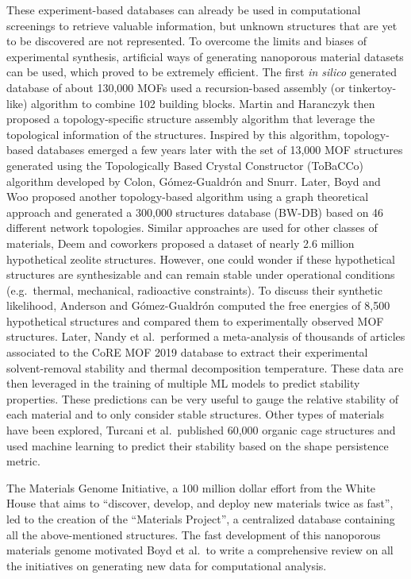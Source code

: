 \documentclass[main.tex]{subfiles}
\begin{document}
These experiment-based databases can already be used in computational screenings to retrieve valuable information, but unknown structures that are yet to be discovered are not represented. To overcome the limits and biases of experimental synthesis, artificial ways of generating nanoporous material datasets can be used, which proved to be extremely efficient. The first \emph{in silico} generated database of about 130,000 MOFs used a recursion-based assembly (or tinkertoy-like) algorithm to combine 102 building blocks.\cite{Wilmer_2012} Martin and Haranczyk then proposed a topology-specific structure assembly algorithm that leverage the topological information of the structures.\cite{Martin_2014} Inspired by this algorithm, topology-based databases emerged a few years later with the set of 13,000 MOF structures generated using the Topologically Based Crystal Constructor (ToBaCCo) algorithm developed by Colon, G{\'{o}}mez-Gualdr{\'{o}}n and Snurr.\cite{Colon_2017} Later, Boyd and Woo proposed another topology-based algorithm using a graph theoretical approach and generated a 300,000 structures database (BW-DB) based on 46 different network topologies.\cite{Boyd_2016} Similar approaches are used for other classes of materials, Deem and coworkers proposed a dataset of nearly 2.6 million hypothetical zeolite structures.\cite{Earl_2006,Deem_2009,Pophale_2011} However, one could wonder if these hypothetical structures are synthesizable and can remain stable under operational conditions (e.g.\ thermal, mechanical, radioactive constraints). To discuss their synthetic likelihood, Anderson and G{\'{o}}mez-Gualdr{\'{o}}n computed the free energies of 8,500 hypothetical structures and compared them to experimentally observed MOF structures.\cite{Anderson_2020} Later, Nandy et al.\ performed a meta-analysis of thousands of articles associated to the CoRE MOF 2019 database to extract their experimental solvent-removal stability and thermal decomposition temperature.\cite{Nandy_2021} These data are then leveraged in the training of multiple ML models to predict stability properties. These predictions can be very useful to gauge the relative stability of each material and to only consider stable structures. Other types of materials have been explored, Turcani et al.\ published 60,000 organic cage structures and used machine learning to predict their stability based on the shape persistence metric.\cite{Turcani_2018}

The Materials Genome Initiative, a 100 million dollar effort from the White House that aims to ``discover, develop, and deploy new materials twice as fast'', led to the creation of the ``Materials Project'', a centralized database containing all the above-mentioned structures.\cite{kalil2011national,Matgenome,Jain_2013}
The fast development of this nanoporous materials genome motivated Boyd et al.\ to write a comprehensive review on all the initiatives on generating new data for computational analysis.\cite{Boyd_2017}
\end{document}
